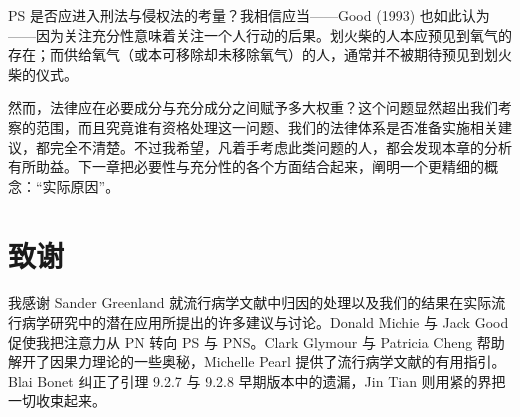 PS 是否应进入刑法与侵权法的考量？我相信应当——Good (1993) 也如此认为——因为关注充分性意味着关注一个人行动的后果。划火柴的人本应预见到氧气的存在；而供给氧气（或本可移除却未移除氧气）的人，通常并不被期待预见到划火柴的仪式。

然而，法律应在必要成分与充分成分之间赋予多大权重？这个问题显然超出我们考察的范围，而且究竟谁有资格处理这一问题、我们的法律体系是否准备实施相关建议，都完全不清楚。不过我希望，凡着手考虑此类问题的人，都会发现本章的分析有所助益。下一章把必要性与充分性的各个方面结合起来，阐明一个更精细的概念：“实际原因”。

\section*{致谢}

我感谢 Sander Greenland 就流行病学文献中归因的处理以及我们的结果在实际流行病学研究中的潜在应用所提出的许多建议与讨论。Donald Michie 与 Jack Good 促使我把注意力从 PN 转向 PS 与 PNS。Clark Glymour 与 Patricia Cheng 帮助解开了因果力理论的一些奥秘，Michelle Pearl 提供了流行病学文献的有用指引。Blai Bonet 纠正了引理 9.2.7 与 9.2.8 早期版本中的遗漏，Jin Tian 则用紧的界把一切收束起来。
